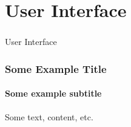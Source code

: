\section[UI]{User Interface}

\begin{frame}
  \frametitle{}
  \begin{center}
    {\Huge User Interface}
  \end{center}
\end{frame}

\begin{frame}
    \frametitle{Some Example Title}
    \framesubtitle{Some example subtitle}
    \centering
    Some text, content, etc.
\end{frame}

